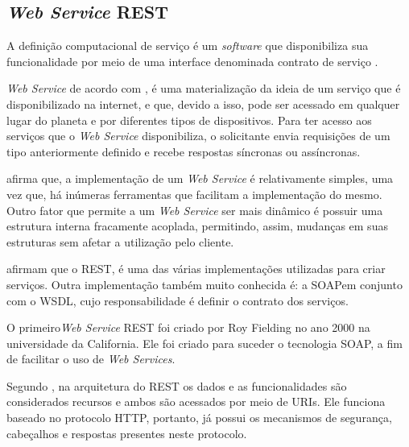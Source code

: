 \subsection{\textit{Web Service} REST}

A definição computacional de serviço é um \textit{software} que disponibiliza sua funcionalidade por meio de uma interface denominada contrato de serviço \cite{erl_soa_with_rest}.

\textit{Web Service} de acordo com , é uma materialização da ideia de um serviço que é disponibilizado na internet, e que, devido a isso, pode ser acessado em qualquer lugar do planeta e por diferentes tipos de dispositivos. Para ter acesso aos serviços que o \textit{Web Service} disponibiliza, o solicitante envia requisições de um tipo anteriormente definido e recebe respostas síncronas ou assíncronas.

 afirma que, a implementação de um \textit{Web Service} é relativamente simples, uma vez que, há inúmeras ferramentas que facilitam a implementação do mesmo. Outro fator que permite a um \textit{Web Service} ser mais dinâmico é possuir uma estrutura interna fracamente acoplada, permitindo, assim, mudanças em suas estruturas sem afetar a utilização pelo cliente.

 afirmam que o REST\footnotemark[20], é uma das várias implementações utilizadas para criar serviços. Outra implementação também muito conhecida é: a SOAP\footnotemark[21] em conjunto com o WSDL\footnotemark[22], cujo responsabilidade é definir o contrato dos serviços.




O primeiro\textit{Web Service} REST foi criado por Roy Fielding no ano 2000 na universidade da California. Ele foi criado para suceder o tecnologia SOAP, a fim de facilitar o uso de \textit{Web Services}\cite{ibm_web_service}.

Segundo , na arquitetura do REST os dados e as funcionalidades são considerados recursos e ambos são acessados por meio de  URIs\footnotemark[23]. Ele funciona baseado no protocolo HTTP, portanto, já possui os mecanismos de segurança, cabeçalhos e respostas presentes neste protocolo.

